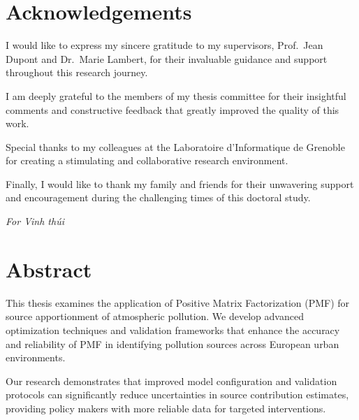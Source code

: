\documentclass[
  letterpaper,
  oneside,
  openany]{MastersDoctoralThesis}
\theoremstyle{plain}
\theoremstyle{remark}
\begin{document}

\chapter*{Acknowledgements}\label{acknowledgements}


I would like to express my sincere gratitude to my supervisors,
Prof.~Jean Dupont and Dr.~Marie Lambert, for their invaluable guidance
and support throughout this research journey.

I am deeply grateful to the members of my thesis committee for their
insightful comments and constructive feedback that greatly improved the
quality of this work.

Special thanks to my colleagues at the Laboratoire d'Informatique de
Grenoble for creating a stimulating and collaborative research
environment.

Finally, I would like to thank my family and friends for their
unwavering support and encouragement during the challenging times of
this doctoral study.

\clearpage
\begin{center}
\vspace*{\fill}
\textit{For Vinh thúi}
\vspace*{\fill}
\end{center}


\chapter*{Abstract}\label{abstract}


This thesis examines the application of Positive Matrix Factorization
(PMF) for source apportionment of atmospheric pollution. We develop
advanced optimization techniques and validation frameworks that enhance
the accuracy and reliability of PMF in identifying pollution sources
across European urban environments.

Our research demonstrates that improved model configuration and
validation protocols can significantly reduce uncertainties in source
contribution estimates, providing policy makers with more reliable data
for targeted interventions.
\end{document}
